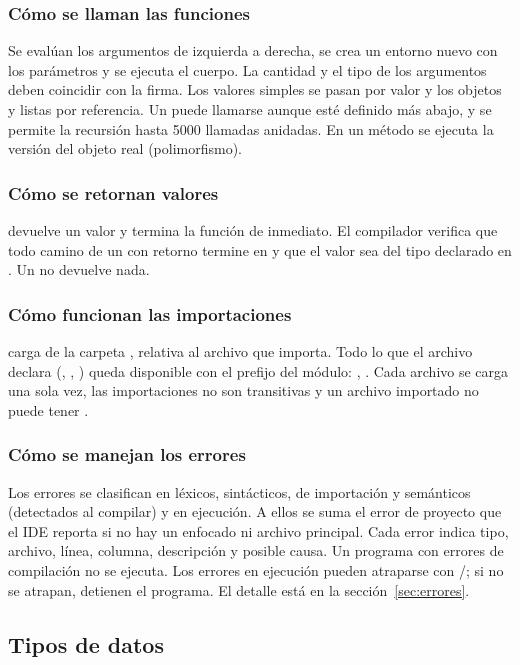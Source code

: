 \subsubsection*{Cómo se llaman las funciones}
Se evalúan los argumentos de izquierda a derecha, se crea un entorno nuevo con los parámetros y se ejecuta el cuerpo. La cantidad y el tipo de los argumentos deben coincidir con la firma. Los valores simples se pasan por valor y los objetos y listas por referencia. Un  puede llamarse aunque esté definido más abajo, y se permite la recursión hasta 5000 llamadas anidadas. En un método se ejecuta la versión del objeto real (polimorfismo).

\subsubsection*{Cómo se retornan valores}
 devuelve un valor y termina la función de inmediato. El compilador verifica que todo camino de un  con retorno termine en  y que el valor sea del tipo declarado en . Un   no devuelve nada.

\subsubsection*{Cómo funcionan las importaciones}
 carga  de la carpeta , relativa al archivo que importa. Todo lo que el archivo declara (, , ) queda disponible con el prefijo del módulo: , . Cada archivo se carga una sola vez, las importaciones no son transitivas y un archivo importado no puede tener .

\subsubsection*{Cómo se manejan los errores}
Los errores se clasifican en léxicos, sintácticos, de importación y semánticos (detectados al compilar) y en ejecución. A ellos se suma el error de proyecto que el IDE reporta si no hay un  enfocado ni archivo principal. Cada error indica tipo, archivo, línea, columna, descripción y posible causa. Un programa con errores de compilación no se ejecuta. Los errores en ejecución pueden atraparse con /; si no se atrapan, detienen el programa. El detalle está en la sección~\ref{sec:errores}.

\subsection{Tipos de datos}

